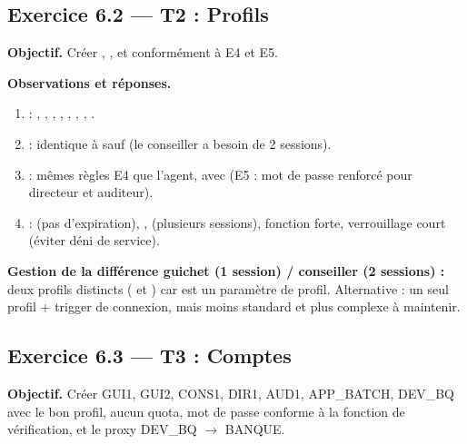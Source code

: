 \subsection{Exercice 6.2 — T2 : Profils}
\textbf{Objectif.} Créer , , 
et  conformément à E4 et E5.


\textbf{Observations et réponses.}
\begin{enumerate}
  \item {} : , ,
        , ,
        , ,
        , .
  \item {} : identique à  sauf
         (le conseiller a besoin de 2 sessions).
  \item {} : mêmes règles E4 que l'agent, avec
         (E5 : mot de passe renforcé pour directeur
        et auditeur).
  \item {} :  (pas d'expiration),
        ,  (plusieurs sessions),
        fonction forte, verrouillage court (éviter déni de service).
\end{enumerate}
\textbf{Gestion de la différence guichet (1 session) / conseiller (2 sessions) :}
deux profils distincts ( et ) car
 est un paramètre de profil. Alternative : un seul profil +
trigger de connexion, mais moins standard et plus complexe à maintenir.

\subsection{Exercice 6.3 — T3 : Comptes}
\textbf{Objectif.} Créer GUI1, GUI2, CONS1, DIR1, AUD1, APP\_BATCH, DEV\_BQ avec le bon
profil, aucun quota, mot de passe conforme à la fonction de vérification, et le proxy
DEV\_BQ $\to$ BANQUE.


